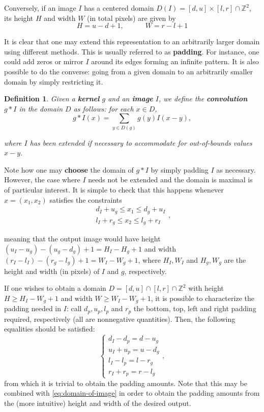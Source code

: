 \documentclass{article}
\newtheorem{definition}{Definition}
\begin{document}
Conversely, if an image \(I\) has a centered domain \(D(I)=[d, u]\times[l, r]\cap\mathbb{Z}^2\), its height \(H\) and width \(W\) (in total pixels) are given by
\begin{equation}\label{eq:dimensions-given-domain}
  H = u - d + 1, \text{~~~~~~~~~} W = r - l + 1
\end{equation}

It is clear that one may extend this representation to an arbitrarily larger domain using different methods. This is usually referred to as \textbf{padding}. For instance, one could add zeros or mirror \(I\) around its edges forming an infinite pattern. It is also possible to do the converse: going from a given domain to an arbitrarily smaller domain by simply restricting it.

\begin{definition}
Given a \textbf{kernel} \(g\) and an \textbf{image} \(I\), we define the \textbf{convolution} \(g\ast I\) in the domain \(D\) as follows: for each \(x\in D\),
\[
  g\ast I(x) = \sum_{y\in D(g)}g(y)I(x-y)
,\]

where \(I\) has been extended if necessary to accommodate for out-of-bounds values \(x-y\).
\end{definition}

Note how one may \textbf{choose} the domain of \(g\ast I\) by simply padding \(I\) as necessary. However, the case where \(I\) needs not be extended and the domain is maximal is of particular interest. It is simple to check that this happens whenever \(x=(x_1, x_2)\) satisfies the constraints
\[
\begin{align}
  d_I+u_g \leq x_1 \leq d_g + u_I\\
  l_I+r_g \leq x_2 \leq l_g + r_I
\end{align}
,\]

meaning that the output image would have height \((u_I-u_g)-(u_g-d_g) +1 = H_I - H_g + 1\) and width \((r_I-l_I) - (r_g - l_g) + 1 = W_I - W_g + 1\), where \(H_I, W_I\) and \(H_g, W_g\) are the height and width (in pixels) of \(I\) and \(g\), respectively.

If one wishes to obtain a domain \(D=[d, u]\cap[l, r]\cap \mathbb{Z}^2\) with height \(H \geq H_I - W_g + 1\) and width \(W \geq W_I - W_g + 1\), it is possible to characterize the padding needed in \(I\): call \(d_p, u_p, l_p\) and \(r_p\) the bottom, top, left and right padding required, respectively (all are nonnegative quantities). Then, the following equalities should be satisfied:
\[
\left\{
\begin{align}
  d_I - d_p = d - u_g\\
  u_I + u_p = u - d_g\\
  l_I - l_p = l - r_g\\
  r_I + r_p = r - l_g
\end{align}
\right.
,\]
from which it is trivial to obtain the padding amounts. Note that this may be combined with \cref{eq:domain-of-image} in order to obtain the padding amounts from the (more intuitive) height and width of the desired output.
\end{document}
